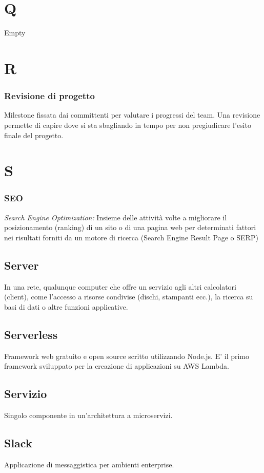 \section*{Q}
Empty

\section*{R}
\subsubsection*{Revisione di progetto}
Milestone fissata dai committenti per valutare i progressi del team. Una revisione permette di capire dove si sta sbagliando in tempo per non pregiudicare l'esito finale del progetto.

\section*{S}
\subsubsection*{SEO}
\textit{Search Engine Optimization:} Insieme delle attività volte a migliorare il posizionamento (ranking) di un sito o di una pagina web per determinati fattori nei risultati forniti
da un motore di ricerca (Search Engine Result Page o SERP)

\subsection*{Server}
In una rete, qualunque computer che offre un servizio agli altri calcolatori (client), come l'accesso a risorse condivise (dischi, stampanti ecc.), la ricerca su basi di dati o altre funzioni applicative.

\subsection*{Serverless}
Framework web gratuito e open source scritto utilizzando Node.js. E' il primo framework sviluppato per la creazione di applicazioni su AWS Lambda.

\subsection*{Servizio}
Singolo componente in un'architettura a microservizi.

\subsection*{Slack}
Applicazione di messaggistica per ambienti enterprise.

